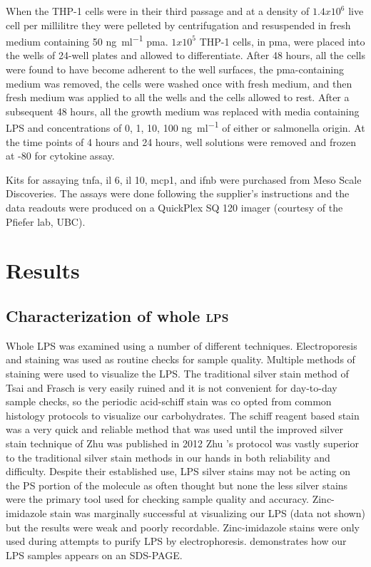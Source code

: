 When the THP-1 cells were in their third passage and at a density of $1.4x10^{6}$ live cell per millilitre they were pelleted by centrifugation and resuspended in fresh medium containing 50 \si{\nano\gram\per\milli\litre} \ac{pma}. $1x10^{5}$ THP-1 cells, in \ac{pma}, were placed into the wells of 24-well plates and allowed to differentiate. After 48 hours, all the cells were found to have become adherent to the well surfaces, the \ac{pma}-containing medium was removed, the cells were washed once with fresh medium, and then fresh medium was applied to all the wells and the cells allowed to rest. After a subsequent 48 hours, all the growth medium was replaced with media containing \ac{LPS} and concentrations of 0, 1, 10, 100 \si{\nano\gram\per\milli\litre} of either \caulobacter{} or \ac{salmonella} origin. At the time points of 4 hours and 24 hours, well solutions were removed and frozen at -80\cel{} for cytokine assay.
      
Kits for assaying \ac{tnfa}, \ac{il} 6, \ac{il} 10, \ac{mcp1}, and \ac{ifnb} were purchased from Meso Scale Discoveries. The assays were done following the supplier's instructions and the data readouts were produced on a QuickPlex SQ 120 imager (courtesy of the Pfiefer lab, UBC).
    
\section{Results} %
\label{sec:lps_results}
\subsection{Characterization of whole \textsc{lps}} %
\label{sub:characterisation_of_whole_lps}

Whole \caulobacter{} \ac{LPS} was examined using a number of different techniques. Electroporesis and staining was used as routine checks for sample quality.  Multiple methods of staining were used to visualize the \ac{LPS}. The traditional silver stain method of Tsai and Frasch is very easily ruined and it is not convenient for day-to-day sample checks, so the periodic acid-schiff stain was co opted from common histology protocols to visualize our carbohydrates.  The schiff reagent based stain was a very quick and reliable method that was used until the improved silver stain technique of Zhu \etal{} was published in 2012 Zhu \etal{}'s protocol was vastly superior to the traditional silver stain methods in our hands in both reliability and difficulty. Despite their established use,  \ac{LPS} silver stains may not be acting on the \ac{PS} portion of the molecule as often thought but none the less silver stains were the primary tool used for checking sample quality and accuracy. Zinc-imidazole stain was marginally successful at visualizing our \ac{LPS} (data not shown) but the results were weak and poorly recordable. Zinc-imidazole stains were only used during attempts to purify \ac{LPS} by electrophoresis.  demonstrates how our \ac{LPS} samples appears on an \ac{SDS-PAGE}.

